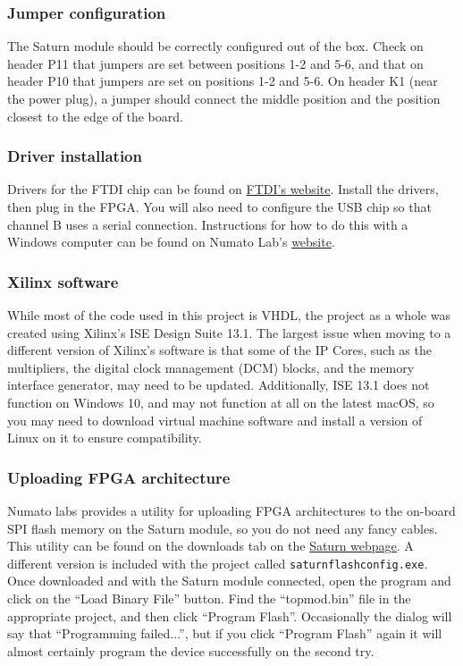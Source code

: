 \documentclass{article}
\begin{document}
\subsubsection{Jumper configuration}
The Saturn module should be correctly configured out of the box.  Check on header P11 that jumpers are set between positions 1-2 and 5-6, and that on header P10 that jumpers are set on positions 1-2 and 5-6.  On header K1 (near the power plug), a jumper should connect the middle position and the position closest to the edge of the board.

\subsubsection{Driver installation}
Drivers for the FTDI chip can be found on \href{https://www.ftdichip.com/Drivers/D2XX.htm}{FTDI's website}.  Install the drivers, then plug in the FPGA.  You will also need to configure the USB chip so that channel B uses a serial connection.  Instructions for how to do this with a Windows computer can be found on Numato Lab's \href{https://numato.com/kb/configuring-ft2232h-usb-serial-converter-saturn-spartan-6-module/}{website}.

\subsubsection{Xilinx software}
While most of the code used in this project is VHDL, the project as a whole was created using Xilinx's ISE Design Suite 13.1.  The largest issue when moving to a different version of Xilinx's software is that some of the IP Cores, such as the multipliers, the digital clock management (DCM) blocks, and the memory interface generator, may need to be updated.  Additionally, ISE 13.1 does not function on Windows 10, and may not function at all on the latest macOS, so you may need to download virtual machine software and install a version of Linux on it to ensure compatibility.

\subsubsection{Uploading FPGA architecture}
Numato labs provides a utility for uploading FPGA architectures to the on-board SPI flash memory on the Saturn module, so you do not need any fancy cables.  This utility can be found on the downloads tab on the \href{https://numato.com/product/saturn-spartan-6-fpga-development-board-with-ddr-sdram}{Saturn webpage}.  A different version is included with the project called \verb|saturnflashconfig.exe|.  Once downloaded and with the Saturn module connected, open the program and click on the ``Load Binary File'' button.  Find the ``topmod.bin'' file in the appropriate project, and then click ``Program Flash''.  Occasionally the dialog will say that ``Programming failed...'', but if you click ``Program Flash'' again it will almost certainly program the device successfully on the second try.
\end{document}
